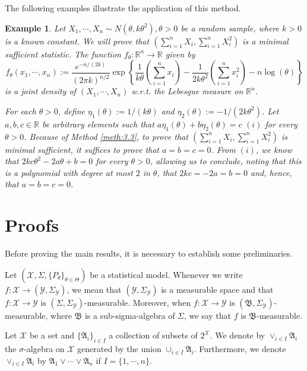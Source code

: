 \documentclass[12pt]{article}
\newtheorem{example}{Example}[section]
\begin{document}
The following examples illustrate the application of this method.

\begin{example}
\label{ex:4.6}
Let $X_1,\cdots ,X_n\sim N(\theta ,k\theta^2),\theta >0$ be a random sample, where $k>0$ is a known constant. We will prove that $(\sum _{i=1}^nX_i,\sum _{i=1}^nX_i^2)$ is a minimal sufficient statistic. The function $f_\theta:\mathbb{R}^n\to \mathbb{R}$ given by $$f_\theta (x_1,\cdots, x_n):=\frac{e^{-n/(2k)}}{(2\pi k)^{n/2}}\exp \left\{\frac{1}{k\theta }\left(\sum _{i=1}^nx_i\right)-\frac{1}{2k\theta ^2}\left(\sum _{i=1}^nx_i^2\right)-n\log (\theta )\right\}$$ is a joint density of $(X_1,\cdots, X_n)$ w.r.t. the Lebesgue measure on $\mathbb{R}^n$.

For each $\theta>0$, define $\eta _1(\theta ):=1/(k\theta )$ and $\eta _2(\theta ):=-1/(2k\theta ^2)$. Let $a,b,c\in\mathbb{R}$ be arbitrary elements such that $a\eta _1(\theta )+b\eta _2(\theta )=c\,\,(i)$ for every $\theta>0$. Because of Method \ref{meth:3.3}, to prove that $(\sum _{i=1}^nX_i,\sum _{i=1}^nX_i^2)$ is minimal sufficient, it suffices to prove that $a=b=c=0$. From $(i)$, we know that $2kc\theta ^2-2a\theta +b=0$ for every $\theta >0$, allowing us to conclude, noting that this is a polynomial with degree at most $2$ in $\theta$, that $2kc=-2a=b=0$ and, hence, that $a=b=c=0$.
\end{example}

\section{Proofs}
\label{sec:proofs}

Before proving the main results, it is necessary to establish some preliminaries. 

Let $(\mathcal{X},\Sigma,\{P_\theta\}_{\theta\in\Theta})$ be a statistical model. Whenever we write $f:\mathcal{X}\to(\mathcal{Y},\Sigma _\mathcal{Y})$, we mean that $(\mathcal{Y},\Sigma _\mathcal{Y})$ is a measurable space and that $f:\mathcal{X}\to\mathcal{Y}$ is $(\Sigma,\Sigma _\mathcal{Y})$-measurable. Moreover, when $f: \mathcal{X} \to \mathcal{Y}$ is $(\mathfrak{B},\Sigma _\mathcal{Y})$-measurable, where $\mathfrak{B}$ is a sub-sigma-algebra of $\Sigma$, we say that $f$ is $\mathfrak{B}$-measurable.


Let $\mathcal{X}$ be a set and $\{\mathfrak{A} _i\}_{i\in I}$ a collection of subsets of $2^\mathcal{X}$. We denote by $\vee_{i\in I}\mathfrak{A}_i$ the $\sigma$-algebra on $\mathcal{X}$ generated by the union $\cup_{i\in I}\mathfrak{A}_i$. Furthermore, we denote $\vee_{i\in I}\mathfrak{A}_i$ by $\mathfrak{A} _1\vee \cdots \vee \mathfrak{A} _n$ if $I=\{1,\cdots, n\}$.
\end{document}
